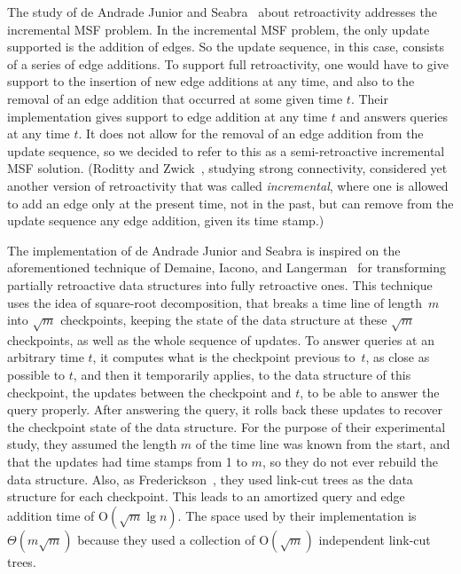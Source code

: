 \documentclass[reqno,11pt]{amsart}
\newcommand{\Oh}{\mathrm{O}}
\begin{document}
The study of de Andrade Junior and Seabra~\cite{deAndradeJrS2022} about retroactivity 
addresses the incremental MSF problem.  In the incremental MSF problem, the only update
supported is the addition of edges.  So the update sequence, in this case, consists 
of a series of edge additions.  To support full retroactivity, one would have to give 
support to the insertion of new edge additions at any time, and also to the removal 
of an edge addition that occurred at some given time $t$.  Their implementation 
gives support to edge addition at any time $t$ and answers queries at any time $t$.  
It does not allow for the removal of an edge addition from the update sequence, 
so we decided to refer to this as a semi-retroactive incremental MSF solution.  
(Roditty and Zwick~\cite{RodittyZ2016}, studying strong connectivity, considered
yet another version of retroactivity that was called \emph{incremental}, 
where one is allowed to add an edge only at the present time, not in the past, 
but can remove from the update sequence any edge addition, given its time stamp.) 

The implementation of de Andrade Junior and Seabra is inspired on the
aforementioned technique of Demaine, Iacono, and Langerman~\cite[Theorem~5]{DemaineIL2007}
for transforming partially retroactive data structures into fully retroactive ones.
This technique uses the idea of square-root decomposition,
that breaks a time line of length~$m$ into $\sqrt{m}$ checkpoints, 
keeping the state of the data structure at these $\sqrt{m}$ checkpoints, 
as well as the whole sequence of updates.  
To answer queries at an arbitrary time $t$, 
it computes what is the checkpoint previous to~$t$, as close as possible to $t$, 
and then it temporarily applies, to the data structure of this checkpoint, 
the updates between the checkpoint and $t$, to be able to answer the query properly.  
After answering the query, 
it rolls back these updates to recover the checkpoint state of the data structure.  
For the purpose of their experimental study, they assumed the length $m$ 
of the time line was known from the start, and that the updates had time 
stamps from 1 to $m$, so they do not ever rebuild the data structure. 
Also, as Frederickson~\cite{Frederickson1983}, 
they used link-cut trees as the data structure for each checkpoint.  
This leads to an amortized query and edge addition time of $\Oh(\sqrt{m}\lg n)$.  
The space used by their implementation is $\Theta(m\sqrt{m})$ 
because they used a collection of $\Oh(\sqrt{m})$ independent link-cut trees. 
\end{document}
